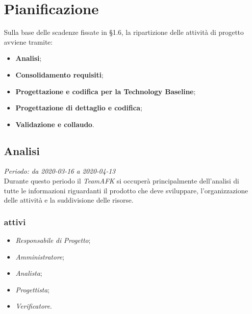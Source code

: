 \section{Pianificazione}
Sulla base delle scadenze fissate in §1.6, la ripartizione delle attività di progetto avviene tramite:
\begin{itemize}
\item \textbf{Analisi};
\item \textbf{Consolidamento requisiti};
\item \textbf{Progettazione e codifica per la Technology Baseline};
\item \textbf{Progettazione di dettaglio e codifica};
\item \textbf{Validazione e collaudo}.
\end{itemize}  

\subsection{Analisi}
\textit{Periodo: da 2020-03-16 a 2020-04-13} \\
Durante questo periodo il \textit{TeamAFK} si occuperà principalmente dell’analisi di tutte le informazioni riguardanti il prodotto che deve sviluppare, l’organizzazione delle attività e la suddivisione delle risorse.

\subsubsection{attivi} 
\begin{itemize}
\item \textit{Responsabile di Progetto};
\item \textit{Amministratore};
\item \textit{Analista};
\item \textit{Progettista};
\item \textit{Verificatore}.
\end{itemize}

